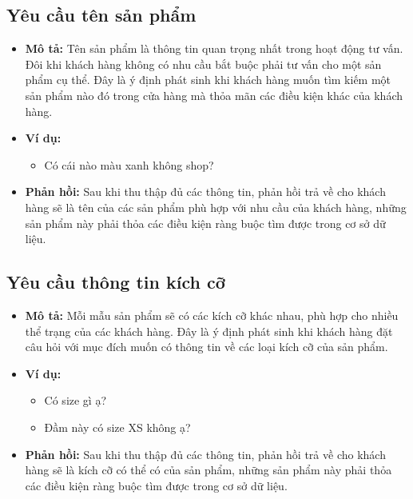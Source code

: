 \subsection{Yêu cầu tên sản phẩm}
\begin{itemize}
    \item \textbf{Mô tả:} Tên sản phẩm là thông tin quan trọng nhất
    trong hoạt động tư vấn. Đôi khi khách hàng không có nhu cầu
    bắt buộc phải tư vấn cho một sản phẩm cụ thể. Đây là ý định
    phát sinh khi khách hàng muốn tìm kiếm một sản phẩm nào đó
    trong cửa hàng mà thỏa mãn các điều kiện khác của khách hàng.
    \item \textbf{Ví dụ:}
    \begin{itemize}
        \item Có cái nào màu xanh không shop?
    \end{itemize}
    \item \textbf{Phản hồi:} Sau khi thu thập đủ các thông tin,
    phản hồi trả về cho khách hàng sẽ là tên của các sản phẩm phù hợp
    với nhu cầu của khách hàng, những sản phẩm này phải thỏa các
    điều kiện ràng buộc tìm được trong cơ sở dữ liệu.
\end{itemize}

\subsection{Yêu cầu thông tin kích cỡ}
\begin{itemize}
    \item \textbf{Mô tả:} Mỗi mẫu sản phẩm sẽ có các kích cỡ
    khác nhau, phù hợp cho nhiều thể trạng của các khách hàng.
    Đây là ý định phát sinh khi khách hàng đặt câu hỏi với
    mục đích muốn có thông tin về các loại kích cỡ của sản phẩm.
    \item \textbf{Ví dụ:}
    \begin{itemize}
        \item Có size gì ạ?
        \item Đầm này có size XS không ạ?
    \end{itemize}
    \item \textbf{Phản hồi:} Sau khi thu thập đủ các thông tin,
    phản hồi trả về cho khách hàng sẽ là kích cỡ có thể có của
    sản phẩm, những sản phẩm này phải thỏa các điều kiện
    ràng buộc tìm được trong cơ sở dữ liệu.
\end{itemize}

